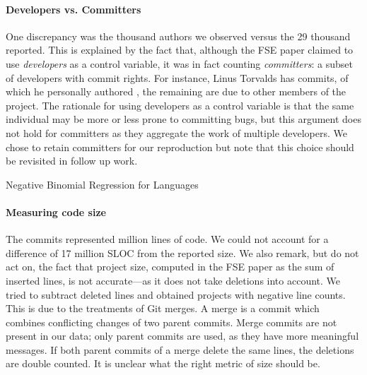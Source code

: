\documentclass[acmsmall]{acmart}
\begin{document}
\paragraph{Developers vs. Committers}
One discrepancy was the \numberAuthors thousand authors we observed versus
the 29 thousand reported. This is explained by the fact that, although the
FSE paper claimed to use \emph{developers} as a control variable, it was in
fact counting \emph{committers}: a subset of developers with commit
rights. For instance, Linus Torvalds has \linusCommitter commits, of which
he personally authored \linusAuthor, the remaining are due to other members
of the project.  The rationale for using developers as a control variable is
that the same individual may be more or less prone to committing bugs, but
this argument does not hold for committers as they aggregate the work of
multiple developers. We chose to retain committers for our reproduction but
note that this choice should be revisited in follow up work.

\begin{table}[t!]
\centering
\caption{Negative Binomial Regression for Languages}
\label{langtable1}
\end{table}

\paragraph{Measuring code size}
The commits represented \slocMio million lines of code. We could not account
for a difference of 17 million SLOC from the reported size.  We also remark,
but do not act on, the fact that project size, computed in the FSE paper as
the sum of inserted lines, is not accurate---as it does not take deletions
into account.  We tried to subtract deleted lines and obtained projects with
negative line counts. This is due to the treatments of Git merges. A merge
is a commit which combines conflicting changes of two parent commits.  Merge
commits are not present in our data; only parent commits are used, as they
have more meaningful messages.  If both parent commits of a merge delete the
same lines, the deletions are double counted.  It is unclear what the right
metric of size should be.
\end{document}
